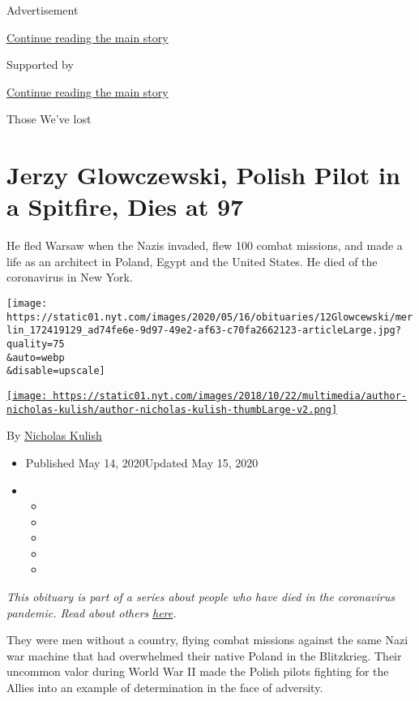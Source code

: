 Advertisement

\protect\hyperlink{after-top}{Continue reading the main story}

Supported by

\protect\hyperlink{after-sponsor}{Continue reading the main story}

Those We've lost

\hypertarget{jerzy-glowczewski-polish-pilot-in-a-spitfire-dies-at-97}{%
\section{Jerzy Glowczewski, Polish Pilot in a Spitfire, Dies at
97}\label{jerzy-glowczewski-polish-pilot-in-a-spitfire-dies-at-97}}

He fled Warsaw when the Nazis invaded, flew 100 combat missions, and
made a life as an architect in Poland, Egypt and the United States. He
died of the coronavirus in New York.

\texttt{[image: https://static01.nyt.com/images/2020/05/16/obituaries/12Glowcewski/merlin\_172419129\_ad74fe6e-9d97-49e2-af63-c70fa2662123-articleLarge.jpg?quality=75\\\&auto=webp\\\&disable=upscale]}

\href{https://www.nytimes.com/by/nicholas-kulish}{\texttt{[image: https://static01.nyt.com/images/2018/10/22/multimedia/author-nicholas-kulish/author-nicholas-kulish-thumbLarge-v2.png]}}

By \href{https://www.nytimes.com/by/nicholas-kulish}{Nicholas Kulish}

\begin{itemize}
\item
  Published May 14, 2020Updated May 15, 2020
\item
  \begin{itemize}
  \item
  \item
  \item
  \item
  \item
  \end{itemize}
\end{itemize}

\emph{This obituary is part of a series about people who have died in
the coronavirus pandemic. Read about others}
\href{https://www.nytimes.com/series/people-who-have-died-of-the-coronavirus}{\emph{here}}\emph{.}

They were men without a country, flying combat missions against the same
Nazi war machine that had overwhelmed their native Poland in the
Blitzkrieg. Their uncommon valor during World War II made the Polish
pilots fighting for the Allies into an example of determination in the
face of adversity.

